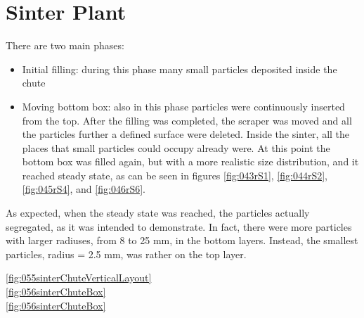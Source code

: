 
\chapter{Sinter Plant}
\label{cap:sinterplant}

There are two main phases:
\begin{itemize}
  \item{Initial filling: during this phase many small particles deposited inside
  the chute}
  \item{Moving bottom box: also in this phase particles were
continuously inserted from the top. After the filling was completed, the
scraper was moved and all the particles further a defined surface were
deleted. Inside the sinter, all the places that small particles could
occupy already were. At this point the bottom box was filled again, but
with a more realistic size distribution, and it reached steady state, as can
be seen in figures \ref{fig:043rS1}, \ref{fig:044rS2}, \ref{fig:045rS4}, and
\ref{fig:046rS6}.}
\end{itemize}
As expected, when the steady state was reached, the particles actually
segregated, as it was intended to demonstrate.
In fact, there were more particles with larger radiuses, from 8 to 25 mm, in the
bottom layers.
Instead, the smallest particles, radius = 2.5 mm, was rather on the top layer. 




\ref{fig:055sinterChuteVerticalLayout} \\


\ref{fig:056sinterChuteBox} \\



\ref{fig:056sinterChuteBox}